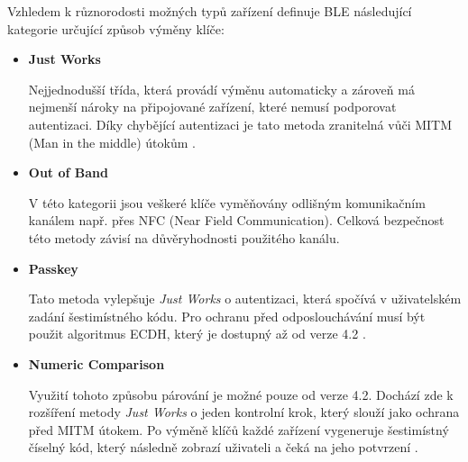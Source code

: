    Vzhledem k různorodosti možných typů zařízení definuje BLE následující kategorie
   určující způsob výměny klíče:
    \begin{itemize}
     \item \textbf{Just Works}
     
     Nejjednodušší třída, která provádí výměnu automaticky a zároveň má nejmenší nároky 
     na připojované zařízení, které nemusí podporovat autentizaci. Díky chybějící autentizaci 
     je tato metoda zranitelná vůči MITM (Man in the middle) útokům \cite{cesnet-survey}.
     \item \textbf{Out of Band}
     
     V této kategorii jsou veškeré klíče vyměňovány odlišným komunikačním kanálem např. přes NFC (Near Field Communication).
     Celková bezpečnost této metody závisí na důvěryhodnosti použitého kanálu.
     \item \textbf{Passkey}
     
     Tato metoda vylepšuje \textit{Just Works} o autentizaci, která spočívá v uživatelském zadání 
     šestimístného kódu. Pro ochranu před odposlouchávání musí být použit algoritmus ECDH,
     který je dostupný až od verze 4.2 \cite{cesnet-survey}.
     
     \item \textbf{Numeric Comparison}
     
     Využití tohoto způsobu párování je možné pouze od verze 4.2. Dochází zde k rozšíření metody \textit{Just Works}
     o jeden kontrolní krok, který slouží jako ochrana před MITM útokem. Po výměně klíčů každé zařízení
     vygeneruje šestimístný číselný kód, který následně zobrazí uživateli a čeká na jeho potvrzení \cite{cesnet-survey}.   
     
    \end{itemize}

    